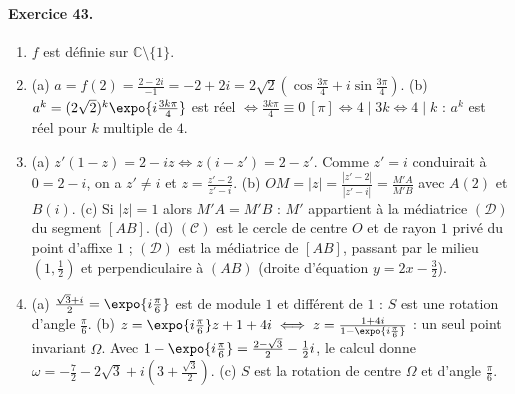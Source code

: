 \begin{corrige}
\paragraph{Exercice 43.}
\begin{enumerate}
\item $f$ est d\'efinie sur $\mathbb{C} \setminus \{1\}$.
\item (a) $a = f(2) = \frac{2 - 2i}{-1} = -2 + 2i = 2\sqrt{2}\left(\cos\frac{3\pi}{4} + i\sin\frac{3\pi}{4}\right)$.
      (b) $a^k = (2\sqrt{2})^k\expo{i\frac{3k\pi}{4}}$ est r\'eel $\iff \frac{3k\pi}{4} \equiv 0\ [\pi] \iff 4 \mid 3k \iff 4 \mid k$ :
      $a^k$ est r\'eel pour $k$ multiple de $4$.
\item (a) $z'(1 - z) = 2 - iz \iff z(i - z') = 2 - z'$. Comme $z' = i$ conduirait \`a $0 = 2 - i$, on a $z' \neq i$ et $z = \frac{z' - 2}{z' - i}$.
      (b) $OM = |z| = \frac{|z' - 2|}{|z' - i|} = \frac{M'A}{M'B}$ avec $A(2)$ et $B(i)$.
      (c) Si $|z| = 1$ alors $M'A = M'B$ : $M'$ appartient \`a la m\'ediatrice $(\mathscr{D})$ du segment $[AB]$.
      (d) $(\mathscr{C})$ est le cercle de centre $O$ et de rayon $1$ priv\'e du point d'affixe $1$ ; $(\mathscr{D})$ est la m\'ediatrice de $[AB]$,
      passant par le milieu $\left(1, \frac{1}{2}\right)$ et perpendiculaire \`a $(AB)$ (droite d'\'equation $y = 2x - \frac{3}{2}$).
\item (a) $\frac{\sqrt{3} + i}{2} = \expo{i\frac{\pi}{6}}$ est de module $1$ et diff\'erent de $1$ : $S$ est une rotation d'angle $\frac{\pi}{6}$.
      (b) $z = \expo{i\frac{\pi}{6}}z + 1 + 4i \iff z = \frac{1 + 4i}{1 - \expo{i\frac{\pi}{6}}}$ : un seul point invariant $\Omega$.
      Avec $1 - \expo{i\frac{\pi}{6}} = \frac{2 - \sqrt{3}}{2} - \frac{1}{2}i$, le calcul donne
      $\omega = -\frac{7}{2} - 2\sqrt{3} + i\left(3 + \frac{\sqrt{3}}{2}\right)$.
      (c) $S$ est la rotation de centre $\Omega$ et d'angle $\frac{\pi}{6}$.
\end{enumerate}

\end{corrige}

